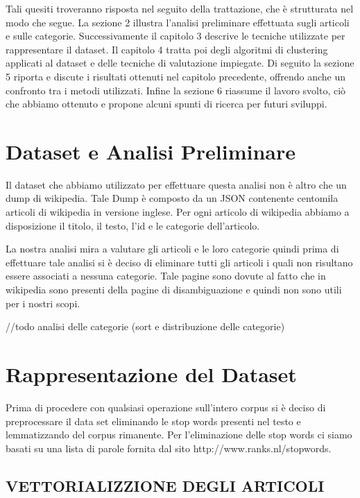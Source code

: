 \documentclass[
12pt, %
a4paper, %
oneside, %
headinclude,footinclude, %
BCOR5mm, %
]{scrartcl}
\begin{document}
Tali quesiti troveranno risposta nel seguito della trattazione, che è strutturata nel modo che segue.
La sezione 2 illustra l'analisi preliminare effettuata sugli articoli e sulle categorie.
Successivamente il capitolo 3 descrive le tecniche utilizzate per rappresentare il dataset.
Il capitolo 4 tratta poi degli algoritmi di clustering applicati al dataset e delle tecniche di valutazione impiegate.
Di seguito la sezione 5 riporta e discute i risultati ottenuti nel capitolo precedente, offrendo anche un confronto tra i metodi utilizzati.
Infine la sezione 6 riassume il lavoro svolto, ciò che abbiamo ottenuto e propone alcuni spunti di ricerca per futuri sviluppi.


\section{Dataset e Analisi Preliminare}

Il dataset che abbiamo utilizzato per effettuare questa analisi non è altro che un dump di wikipedia.
Tale Dump è composto da un JSON contenente centomila articoli di wikipedia in versione inglese. Per ogni articolo di
wikipedia abbiamo a disposizione il titolo, il testo, l'id e le categorie dell'articolo.

La nostra analisi mira a valutare gli articoli e le loro categorie quindi prima di effettuare
tale analisi si è deciso di eliminare tutti gli articoli i quali non risultano essere associati a
nessuna categorie. Tale pagine sono dovute al fatto che in wikipedia sono presenti della pagine di
disambiguazione e quindi non sono utili per i nostri scopi.

//todo analisi delle categorie (sort e distribuzione delle categorie)

\section{Rappresentazione del Dataset}

	Prima di procedere con qualsiasi operazione sull'intero corpus si è deciso di preprocessare il data set
    eliminando le stop words presenti nel testo e lemmatizzando del corpus rimanente. Per l'eliminazione delle
    stop words ci siamo basati su una lista di parole fornita dal sito http://www.ranks.nl/stopwords.

	\subsection{VETTORIALIZZIONE DEGLI ARTICOLI}
\end{document}

